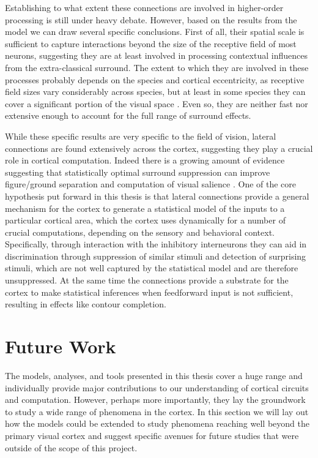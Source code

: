 Establishing to what extent these connections are involved in
higher-order processing is still under heavy debate. However, based on the 
results from the model we can draw several specific conclusions. First
of all, their spatial scale is sufficient to capture interactions
beyond the size of the receptive field of most neurons, suggesting
they are at least involved in processing contextual influences from
the extra-classical surround. The extent to which they are involved in
these processes probably depends on the species and cortical
eccentricity, as receptive field sizes vary considerably across
species, but at least in some species they can cover a significant
portion of the visual space \citep{Bosking1997}. Even so, they are
neither fast nor extensive enough to account for the full range of
surround effects.

While these specific results are very specific to the field of vision, lateral
connections are found extensively across the cortex, suggesting they
play a crucial role in cortical computation. Indeed there is a growing
amount of evidence suggesting that statistically optimal surround
suppression can improve figure/ground separation and computation of
visual salience \citep{Coen-Cagli2013, Coen2015}. One of the core
hypothesis put forward in this thesis is that lateral connections
provide a general mechanism for the cortex to generate a statistical
model of the inputs to a particular cortical area, which the cortex
uses dynamically for a number of crucial computations, depending on
the sensory and behavioral context. Specifically, through interaction
with the inhibitory interneurons they can aid in discrimination
through suppression of similar stimuli and detection of surprising
stimuli, which are not well captured by the statistical model and
are therefore unsuppressed. At the same time the connections provide a substrate
for the cortex to make statistical inferences when feedforward input
is not sufficient, resulting in effects like contour completion.

\section{Future Work}

The models, analyses, and tools presented in this thesis cover a huge
range and individually provide major contributions to our
understanding of cortical circuits and computation. However, perhaps
more importantly, they lay the groundwork to study a wide range of
phenomena in the cortex. In this section we will lay out how the
models could be extended to study phenomena reaching well beyond the
primary visual cortex and suggest specific avenues for future studies
that were outside of the scope of this project.

